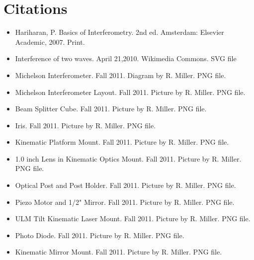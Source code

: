 \onecolumn
\section{Citations}

\begin{itemize}
\renewcommand{\labelitemi}{$\circ$}
\item Hariharan, P. Basics of Interferometry. 2nd ed. Amsterdam: Elsevier Academic, 2007. Print.
\item Interference of two waves. April 21,2010. Wikimedia Commons. SVG file
\item Michelson Interferometer. Fall 2011. Diagram by R. Miller. PNG file.
\item Michelson Interferometer Layout. Fall 2011. Picture by R. Miller. PNG file.
\item Beam Splitter Cube. Fall 2011. Picture by R. Miller. PNG file.
\item Iris. Fall 2011. Picture by R. Miller. PNG file.
\item Kinematic Platform Mount. Fall 2011. Picture by R. Miller. PNG file.
\item 1.0 inch Lens in Kinematic Optics Mount. Fall 2011. Picture by R. Miller. PNG file.
\item Optical Post and Post Holder. Fall 2011. Picture by R. Miller. PNG file.
\item Piezo Motor and 1/2" Mirror. Fall 2011. Picture by R. Miller. PNG file.
\item ULM Tilt Kinematic Laser Mount. Fall 2011. Picture by R. Miller. PNG file.
\item Photo Diode. Fall 2011. Picture by R. Miller. PNG file.
\item Kinematic Mirror Mount. Fall 2011. Picture by R. Miller. PNG file.
\end{itemize}
